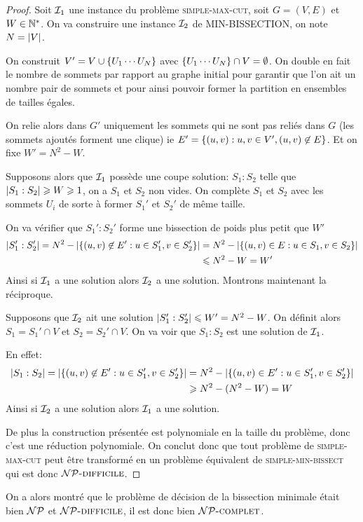 \documentclass{standalone}
\begin{document}
\begin{proof}
Soit $\mathcal I_1$ une instance du problème \textsc{simple-max-cut}, soit $G=(V,E)$ et $W \in \mathbb{N}^*$. On va construire une instance $\mathcal I_2$ de \textsc{MIN-BISSECTION}, on note $N = \left| V\right|$.

On construit $V' = V \cup \left\{ U_1 \cdots U_N\right\}$ avec $\left\{ U_1 \cdots U_N\right\} \cap V = \emptyset$. On double en fait le nombre de sommets par rapport au graphe initial pour garantir que l'on ait un nombre pair de sommets et pour ainsi pouvoir former la partition en ensembles de tailles égales.

On relie alors dans $G'$ uniquement les sommets qui ne sont pas reliés dans $G$ (les sommets ajoutés forment une clique) ie $E' = \left\{ (u,v) : u,v \in V', (u,v) \not \in E\right\}$. Et on fixe $W' = N^2 - W$.

Supposons alors que $\mathcal I_1$ possède une coupe solution: $S_1:S_2$ telle que $\left| S_1:S_2\right| \geqslant W \geqslant 1$, on a $S_1$ et $S_2$ non vides.
On complète $S_1$ et $S_2$ avec les sommets $U_i$ de sorte à former $S_1'$ et $S_2'$ de même taille.

On va vérifier que $S_1':S_2'$ forme une bissection de poids plus petit que $W'$
\begin{align*}
	\left| S_1':S_2'\right| = N^2 - \left| \left\{ (u,v) \not \in E' : u \in S_1', v \in S_2'\right\}\right| &= N^2 - \left| \left\{ (u,v) \in E : u \in S_1, v \in S_2\right\}\right| \\
					& \leqslant N^2 - W = W'
\end{align*}
Ainsi si $\mathcal I_1$ a une solution alors $\mathcal I_2$ a une solution. Montrons maintenant la réciproque.

Supposons que $\mathcal I_2$ ait une solution $\left| S_1':S_2'\right| \leqslant W' = N^2 - W$. On définit alors $S_1 = S_1' \cap V$ et $S_2 = S_2' \cap V$. On va voir que $S_1:S_2$ est une solution de $\mathcal I_1$.

En effet: 
\begin{align*}
	\left| S_1:S_2\right| = \left| \left\{ (u,v) \not \in E' : u \in S_1', v \in S_2'\right\}\right| &= N^2 -  \left| \left\{ (u,v) \in E' : u \in S_1', v \in S_2'\right\}\right| \\
				   &\geqslant N^2 - (N^2 - W) = W
\end{align*}
Ainsi si $\mathcal I_2$ a une solution alors $\mathcal I_1$ a une solution.

De plus la construction présentée est polynomiale en la taille du problème, donc c'est une réduction polynomiale. On conclut donc que tout problème de \textsc{simple-max-cut} peut être transformé en un problème équivalent de \textsc{simple-min-bissect} qui est donc $\mathcal{NP}\text{\textsc{-difficile}}$. 
\end{proof}

On a alors montré que le problème de décision de la bissection minimale était bien $\mathcal{NP}$ et $\mathcal{NP}\text{\textsc{-difficile}}$, il est donc bien $\mathcal{NP}\text{\textsc{-complet}}$.
\end{document}
